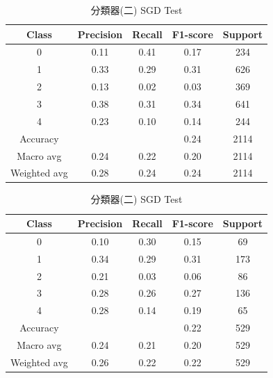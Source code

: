 \begin{enumerate}
\begin{enumerate}
                \begin{table}[H]
                \centering
                \scriptsize
                \begin{minipage}{0.48\textwidth}
                \centering
                \begin{tabular}{c|cccc}
                \hline
                Class & Precision & Recall & F1-score & Support \\
                \hline
                0 & 0.11 & 0.41 & 0.17 & 234 \\
                1 & 0.33 & 0.29 & 0.31 & 626 \\
                2 & 0.13 & 0.02 & 0.03 & 369 \\
                3 & 0.38 & 0.31 & 0.34 & 641 \\
                4 & 0.23 & 0.10 & 0.14 & 244 \\
                \hline
                Accuracy &       &       & 0.24 & 2114 \\
                Macro avg & 0.24 & 0.22 & 0.20 & 2114 \\
                Weighted avg & 0.28 & 0.24 & 0.24 & 2114 \\
                \hline
                \end{tabular}
                \caption{分類器(二) SGD Train}
                \label{tab:classifier_2_report_train_logreg_sgd_non_filtered}
                \end{minipage}%
                \hfill
                \begin{minipage}{0.48\textwidth}
                \centering
                \begin{tabular}{c|cccc}
                \hline
                Class & Precision & Recall & F1-score & Support \\
                \hline
                0 & 0.10 & 0.30 & 0.15 & 69 \\
                1 & 0.34 & 0.29 & 0.31 & 173 \\
                2 & 0.21 & 0.03 & 0.06 & 86 \\
                3 & 0.28 & 0.26 & 0.27 & 136 \\
                4 & 0.28 & 0.14 & 0.19 & 65 \\
                \hline
                Accuracy &       &       & 0.22 & 529 \\
                Macro avg & 0.24 & 0.21 & 0.20 & 529 \\
                Weighted avg & 0.26 & 0.22 & 0.22 & 529 \\
                \hline
                \end{tabular}
                \caption{分類器(二) SGD Test}
                \label{tab:classifier_2_report_test_logreg_sgd_non_filtered}
                \end{minipage}
                \end{table}


\end{enumerate}
\end{enumerate}
